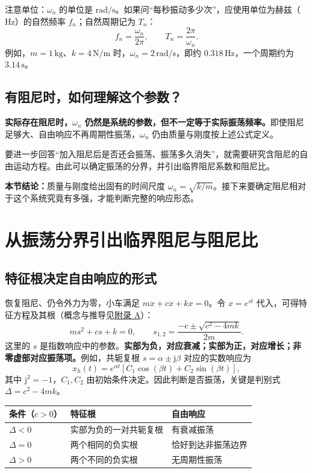 \documentclass[UTF8,a4paper,11pt,fontset=windows]{ctexart}
\newcommand{\unit}[1]{\,\mathrm{#1}}
\begin{document}
注意单位：$\omega_n$ 的单位是 $\mathrm{rad/s}$。如果问“每秒振动多少次”，应使用单位为赫兹（$\mathrm{Hz}$）的自然频率 $f_n$；自然周期记为 $T_n$：
\[
  \boxed{f_n=\frac{\omega_n}{2\pi}},
  \qquad
  \boxed{T_n=\frac{2\pi}{\omega_n}}.
\]
例如，$m=1\unit{kg}$、$k=4\unit{N/m}$ 时，$\omega_n=2\unit{rad/s}$，即约 $0.318\unit{Hz}$，一个周期约为 $3.14\unit{s}$。

\subsection{有阻尼时，如何理解这个参数？}
\textbf{实际存在阻尼时，$\omega_n$ 仍然是系统的参数，但不一定等于实际振荡频率。}即使阻尼足够大、自由响应不再周期性振荡，$\omega_n$ 仍由质量与刚度按上述公式定义。

要进一步回答“加入阻尼后是否还会振荡、振荡多久消失”，就需要研究含阻尼的自由运动方程。由此可以确定振荡的分界，并引出临界阻尼系数和阻尼比。

\begin{keybox}
\textbf{本节结论：}质量与刚度给出固有的时间尺度 $\omega_n=\sqrt{k/m}$。接下来要确定阻尼相对于这个系统究竟有多强，才能判断完整的响应形态。
\end{keybox}

\newpage
\section{从振荡分界引出临界阻尼与阻尼比}

\subsection{特征根决定自由响应的形式}
恢复阻尼、仍令外力为零，小车满足 $m\ddot x+c\dot x+kx=0$。令 $x=e^{st}$ 代入，可得特征方程及其根（概念与推导见\hyperref[app:characteristic]{附录 A}）：
\begin{equation}\label{eq:characteristic}
  ms^2+cs+k=0,
  \qquad
  s_{1,2}=\frac{-c\pm\sqrt{c^2-4mk}}{2m}.
\end{equation}
这里的 $s$ 是指数响应中的参数。\textbf{实部为负，对应衰减；实部为正，对应增长；非零虚部对应振荡项。}例如，共轭复根 $s=\alpha\pm\mathrm{j}\beta$ 对应的实数响应为
\[
  x_h(t)=e^{\alpha t}\left[C_1\cos(\beta t)+C_2\sin(\beta t)\right],
\]
其中 $\mathrm{j}^2=-1$，$C_1,C_2$ 由初始条件决定。因此判断是否振荡，关键是判别式 $\Delta=c^2-4mk$。

\noindent
\begin{tabularx}{\linewidth}{@{}p{32mm}YY@{}}
\toprule
条件（$c>0$） & 特征根 & 自由响应 \\
\midrule
$\Delta<0$ & 实部为负的一对共轭复根 & 有衰减振荡 \\
$\Delta=0$ & 两个相同的负实根 & 恰好到达非振荡边界 \\
$\Delta>0$ & 两个不同的负实根 & 无周期性振荡 \\
\bottomrule
\end{tabularx}
\end{document}
